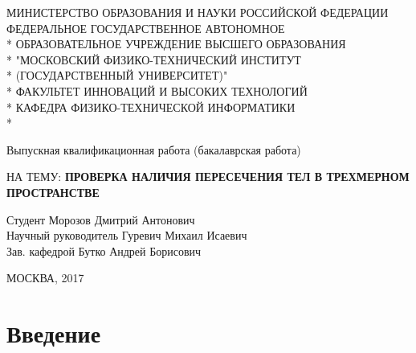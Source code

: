 \documentclass[pdftex,ptm,12pt,a4paper]{report}
\begin{document}
\begin{titlepage}
\newpage

\begin{center}{\small
МИНИСТЕРСТВО ОБРАЗОВАНИЯ И НАУКИ РОССИЙСКОЙ ФЕДЕРАЦИИ \\
\vspace{0.1cm}
ФЕДЕРАЛЬНОЕ ГОСУДАРСТВЕННОЕ АВТОНОМНОЕ  \\*
ОБРАЗОВАТЕЛЬНОЕ УЧРЕЖДЕНИЕ ВЫСШЕГО ОБРАЗОВАНИЯ \\*
"МОСКОВСКИЙ ФИЗИКО-ТЕХНИЧЕСКИЙ ИНСТИТУТ \\*
(ГОСУДАРСТВЕННЫЙ УНИВЕРСИТЕТ)" \\*
\vspace{0.1cm}
ФАКУЛЬТЕТ ИННОВАЦИЙ И ВЫСОКИХ ТЕХНОЛОГИЙ \\*
КАФЕДРА ФИЗИКО-ТЕХНИЧЕСКОЙ ИНФОРМАТИКИ \\*
\hrulefill
}
\end{center}

\begin{center}
\Large Выпускная квалификационная работа (бакалаврская работа)
\end{center}

\vspace{1em}

\begin{center}
\Large НА ТЕМУ:
\linebreak
\textsc{\large{\textbf{ПРОВЕРКА НАЛИЧИЯ ПЕРЕСЕЧЕНИЯ ТЕЛ В ТРЕХМЕРНОМ ПРОСТРАНСТВЕ}}}
\end{center}

\vspace{4em}

\begin{flushleft}
Студент \hrulefill Морозов Дмитрий Антонович \\
Научный руководитель \hrulefill Гуревич Михаил Исаевич\\
Зав. кафедрой \hrulefill Бутко Андрей Борисович\\
\end{flushleft}

\vspace{\fill}

\begin{center}
МОСКВА, 2017
\end{center}

\end{titlepage}

\tableofcontents

\clearpage

\chapter{Введение}
\end{document}
